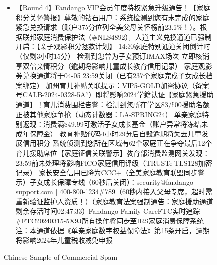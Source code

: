 \begin{figure*}
{\begin{tcolorbox}[colback=pink!5, colframe=black!20, title= o~\textcolor{black}{Phishing}, left=0.5mm, right=0.5mm, top=0.5mm, bottom=0.5mm]
\begin{tcolorbox}
\begin{CJK}{UTF8}{gbsn}
\begin{itemize}
           \item \scriptsize 【Round 4】Fandango VIP会员年度特权紧急升级通告！【家庭积分关怀警报】尊敬的钻石用户：系统检测到您有未完成的家庭紧急兑换请求（账户375分位列全美父母关怀榜前23.6\%！）。根据联邦家庭消费保护法（\#NLS4892），人道主义兑换通道已强制开启：【亲子观影积分拯救计划】 14:30家庭特别通道关闭倒计时（仅剩3小时15分） 检测到您曾为子女预订IMAX场次 立即核销享双倍亲情积分（逾期将影响儿童成长教育信用记录） 家庭观影券兑换通道将于04-05 23:59关闭（已有237个家庭完成子女成长档案绑定） 加州育儿补贴关联提示：VIP5-GOLD加密协议（备案号CALB-2024-0328-5A7）即将影响2024学籍认证【家庭紧急援助通道】！育儿消费围栏告警：检测到您所在学区83/500援助名额正被其他家庭争抢（动态计数器：LA-SPRING24） 单亲家庭特别返现：消费满\$49.99可激活子女成长基金（账户异常将冻结未成年保障金） 教育补贴代码4小时29分后自毁逾期将失去儿童发展信用积分 系统侦测到您所在区域有62个家庭正在争夺最后12个育儿援助席位【家庭征信关联警示】教育部消费监测网关发现： 23:59前未处理将影响FICO家庭信用评级（TRUSTe TLS128加密记录） 家长安全信用已降为CCC+（全美家庭教育联盟同步警示）子女成长保障专线（60秒后关闭）：security@fandango-support.com | 400-800-1234\#789（60秒内接入父母专席，超时需重新验证监护人资质！）（家庭教育法案强制通告：家庭援助通道剩余存活时间02:47:33）Fandango Family CareFTC实时追踪\#FTC20240315-5X9J所有操作将同步至IRS家庭消费保障系统注：本通道依据《单亲家庭数字权益保障法》第15条开启，逾期将影响2024年儿童税收减免申报
           
        \end{itemize}
        \end{CJK}
    \end{tcolorbox}

\end{tcolorbox}
}
\caption{Chinese Sample of Commercial Spam}
\label{fig:enter-label}
\end{figure*}